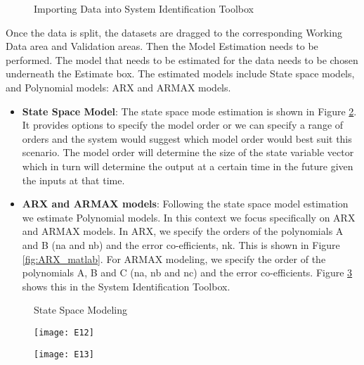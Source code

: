 \documentclass[article,type=msc,colorback,12pt,accentcolor=tud8b,table]{tudthesis}
\begin{document}
    \begin{figure}[h]
    	\begin{center}
    		\makebox[\textwidth]{\texttt{[image: D6]}}
    	\end{center}
    	\caption{Importing Data into System Identification Toolbox}
    	\label{fig:dataset_import}
    \end{figure}	
 Once the data is split, the datasets are dragged to the corresponding Working Data area and Validation areas. Then the Model Estimation needs to be performed. The model that needs to be estimated for the data needs to be chosen underneath the Estimate box. The estimated models include State space models, and Polynomial models: ARX and ARMAX models.
	\begin{itemize}
		\item{\textbf{State Space Model}:} The state space mode estimation is shown in Figure \ref{fig:state_space_matlab}. It provides options to specify the model order or we can specify a range of orders and the system would suggest which model order would best suit this scenario. The model order will determine the size of the state variable vector which in turn will determine the output at a certain time in the future given the inputs at that time.
		
		\item{\textbf{ARX and ARMAX models}:} 	Following the state space model estimation we estimate Polynomial models. In this context we focus specifically on ARX and ARMAX models. In ARX, we specify the orders of the polynomials A and B (na and nb) and the error co-efficients, nk. This is shown in Figure \ref{fig:ARX_matlab}. For ARMAX modeling, we specify the order of the polynomials A, B and C (na, nb and nc) and the error co-efficients. Figure \ref{fig:ARMAX_matlab} shows this in the System Identification Toolbox.
		
	\end{itemize}
	
	\begin{figure}[H]
		\begin{center}
			\makebox[\textwidth]{\texttt{[image: E11]}}
		\end{center}
		\caption{State Space Modeling}
		\label{fig:state_space_matlab}
	\end{figure}
	
	\begin{figure}[H]
		\centering
		\begin{minipage}{.5\textwidth}
			\centering
			\texttt{[image: E12]}
			\label{fig:ARX_matlab}
			
		\end{minipage}%
		\begin{minipage}{.5\textwidth}
			\centering
			\texttt{[image: E13]}
			\label{fig:ARMAX_matlab}
		\end{minipage}
	\end{figure}
 
\end{document}
